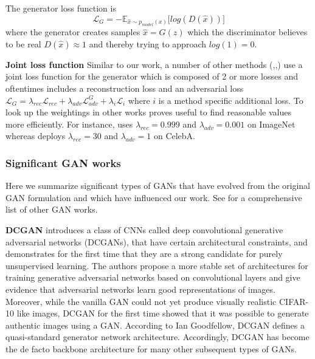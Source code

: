 \documentclass[12pt,a4paper]{article}
\begin{document}
The generator loss function is
\begin{equation} \label{eq:g_loss}
    \mathcal{L}_{G} = -\mathbb{E}_{\hat{x}\sim p_{model} (x)}\big[log(D(\hat{x}))\big]
\end{equation}
where the generator creates samples $\hat{x} = G(z)$ which the discriminator believes to be real $D(\hat{x}) \approx 1$ and thereby trying to approach $log(1) = 0$.

\par \textbf{Joint loss function}
Similar to our work, a number of other methods (\cite{1511.05440},\cite{DisentFacOfVarByMixTh},\cite{1604.07379}) use a joint loss function for the generator which is composed of 2 or more losses and oftentimes includes a reconstruction loss and an adversarial loss $\mathcal{L}_G = \lambda_{rec}\mathcal{L}_{rec} + \lambda_{adv}\mathcal{L}^G_{adv} + \lambda_{i}\mathcal{L}_{i}$ where $i$ is a method specific additional loss. To look up the weightings in other works proves useful to find reasonable values more efficiently. For instance, \cite{1604.07379} uses $\lambda_{rec} = 0.999$ and $\lambda_{adv} = 0.001$ on ImageNet whereas \cite{DisentFacOfVarByMixTh} deploys $\lambda_{rec} = 30$ and $\lambda_{adv} = 1$ on CelebA.

\subsubsection{Significant GAN works}
Here we summarize significant types of GANs that have evolved from the original GAN formulation and which have influenced our work. See \cite{theGanZoo} for a comprehensive list of other GAN works.

\par \textbf{DCGAN} \cite{DCGAN} introduces a class of CNNs called deep convolutional generative adversarial networks (DCGANs), that have certain architectural constraints, and demonstrates for the first time that they are a strong candidate for purely unsupervised learning. The authors propose a more stable set of architectures for training generative adversarial networks based on convolutional layers and give evidence that adversarial networks learn good representations of images. Moreover, while the vanilla GAN could not yet produce visually realistic CIFAR-10 like images, DCGAN for the first time showed that it was possible to generate authentic images using a GAN. According to Ian Goodfellow, DCGAN defines a quasi-standard generator network architecture. Accordingly, DCGAN has become the de facto backbone architecture for many other subsequent types of GANs.
\end{document}
